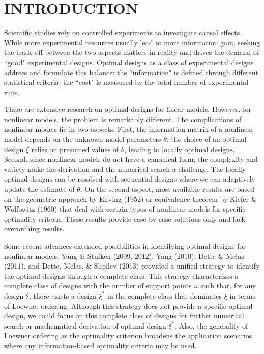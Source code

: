 \documentclass[12pt]{TD-CJS}
\begin{document}

\section{INTRODUCTION}
Scientific studies rely on controlled experiments to investigate causal effects. While more experimental resources usually lead to more information gain, seeking the trade-off between the two aspects matters in reality and drives the demand of ``good" experimental designs. Optimal designs as a class of experimental designs address and formulate this balance: the ``information" is defined through different statistical criteria; the ``cost" is measured by the total number of experimental runs. 






There are extensive research on optimal designs for linear models. However, for nonlinear models, the problem is remarkably different. The complications of nonlinear models lie in two aspects. First, the information matrix of a nonlinear model depends on the unknown model parameters $\theta$: the choice of an optimal design $\xi$ relies on presumed values of $\theta$, leading to locally optimal designs. 
Second, since nonlinear models do not have a canonical form, the complexity and variety make the derivation and the numerical search a challenge. The locally optimal designs can be resolved with sequential designs where we can adaptively update the estimate of $\theta$.
On the second aspect, most available results are based on the geometric approach by Elfving (1952) or equivalence theorem by Kiefer \& Wolfowitz (1960) that deal with certain types of nonlinear models for specific optimality criteria. These results provide case-by-case solutions only and lack overarching results.




Some recent advances extended possibilities in identifying optimal designs for nonlinear models. Yang \& Stufken (2009, 2012), Yang (2010), Dette \& Melas (2011), and Dette, Melas, \& Shpilev (2013) provided a unified strategy to identify the optimal designs through a complete class. This strategy characterizes a complete class of designs with the number of support points $n$ such that, for any design $\xi$, there exists a design $\xi^*$ in the complete class that dominates $\xi$ in terms of Loewner ordering. Although this strategy does not provide a specific optimal design, we could focus on this complete class of designs for further numerical search or mathematical derivation of optimal design $\xi^*$. Also, the generality of Loewner ordering as the optimality criterion broadens the application scenarios where any information-based optimality criteria may be used.
\end{document}
